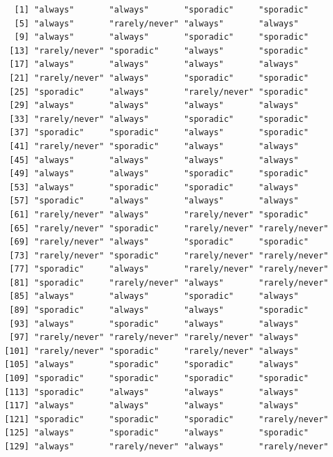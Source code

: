 \documentclass[
  letterpaper,
  DIV=11,
  numbers=noendperiod]{scrartcl}
\newenvironment{Shaded}{\begin{snugshade}}{\end{snugshade}}
\newcommand{\CommentTok}[1]{\textcolor[rgb]{0.37,0.37,0.37}{#1}}
\newcommand{\NormalTok}[1]{\textcolor[rgb]{0.00,0.23,0.31}{#1}}
\newcommand{\SpecialCharTok}[1]{\textcolor[rgb]{0.37,0.37,0.37}{#1}}
\begin{document}
\begin{Shaded}
\end{Shaded}

\begin{verbatim}
   [1] "always"       "always"       "sporadic"     "sporadic"    
   [5] "always"       "rarely/never" "always"       "always"      
   [9] "always"       "always"       "sporadic"     "sporadic"    
  [13] "rarely/never" "sporadic"     "always"       "sporadic"    
  [17] "always"       "always"       "always"       "always"      
  [21] "rarely/never" "always"       "sporadic"     "sporadic"    
  [25] "sporadic"     "always"       "rarely/never" "sporadic"    
  [29] "always"       "always"       "always"       "always"      
  [33] "rarely/never" "always"       "sporadic"     "sporadic"    
  [37] "sporadic"     "sporadic"     "always"       "sporadic"    
  [41] "rarely/never" "sporadic"     "always"       "always"      
  [45] "always"       "always"       "always"       "always"      
  [49] "always"       "always"       "sporadic"     "sporadic"    
  [53] "always"       "sporadic"     "sporadic"     "always"      
  [57] "sporadic"     "always"       "always"       "always"      
  [61] "rarely/never" "always"       "rarely/never" "sporadic"    
  [65] "rarely/never" "sporadic"     "rarely/never" "rarely/never"
  [69] "rarely/never" "always"       "sporadic"     "sporadic"    
  [73] "rarely/never" "sporadic"     "rarely/never" "rarely/never"
  [77] "sporadic"     "always"       "rarely/never" "rarely/never"
  [81] "sporadic"     "rarely/never" "always"       "rarely/never"
  [85] "always"       "always"       "sporadic"     "always"      
  [89] "sporadic"     "always"       "always"       "sporadic"    
  [93] "always"       "sporadic"     "always"       "always"      
  [97] "rarely/never" "rarely/never" "rarely/never" "always"      
 [101] "rarely/never" "sporadic"     "rarely/never" "always"      
 [105] "always"       "sporadic"     "sporadic"     "always"      
 [109] "sporadic"     "sporadic"     "sporadic"     "sporadic"    
 [113] "sporadic"     "always"       "always"       "always"      
 [117] "always"       "always"       "always"       "always"      
 [121] "sporadic"     "sporadic"     "sporadic"     "rarely/never"
 [125] "always"       "sporadic"     "always"       "sporadic"    
 [129] "always"       "rarely/never" "always"       "rarely/never"

\end{verbatim}
\end{document}

